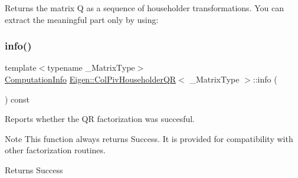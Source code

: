 \begin{DoxyReturn}{Returns}
the matrix Q as a sequence of householder transformations. You can extract the meaningful part only by using\+: 
\begin{DoxyCode}{0}
\end{DoxyCode}
 
\end{DoxyReturn}
\mbox{\label{class_eigen_1_1_col_piv_householder_q_r_a5c756a789175197cab3eff3a3e479ef2}} 
\subsubsection{\texorpdfstring{info()}{info()}}
{\footnotesize\ttfamily template$<$typename \+\_\+\+Matrix\+Type$>$ \\
\mbox{\hyperlink{group__enums_ga85fad7b87587764e5cf6b513a9e0ee5e}{Computation\+Info}} \mbox{\hyperlink{class_eigen_1_1_col_piv_householder_q_r}{Eigen\+::\+Col\+Piv\+Householder\+QR}}$<$ \+\_\+\+Matrix\+Type $>$\+::info (\begin{DoxyParamCaption}{ }\end{DoxyParamCaption}) const\hspace{0.3cm}{\ttfamily [inline]}}



Reports whether the QR factorization was succesful. 

\begin{DoxyNote}{Note}
This function always returns {\ttfamily Success}. It is provided for compatibility with other factorization routines. 
\end{DoxyNote}
\begin{DoxyReturn}{Returns}
{\ttfamily Success} 
\end{DoxyReturn}
\mbox{\label{class_eigen_1_1_col_piv_householder_q_r_a31c45402e74774d9cd13af0e57a6b72f}} 
